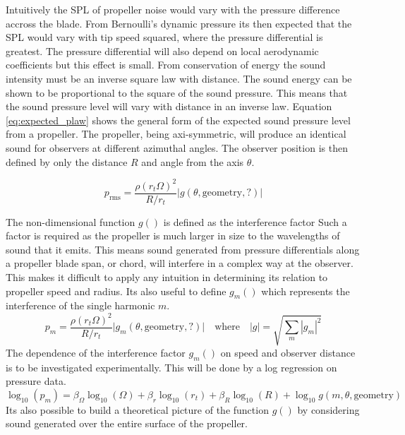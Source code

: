 \documentclass[12pt,a4paper]{article}
\begin{document}
Intuitively the SPL of propeller noise would vary with the pressure difference accross the blade.
From Bernoulli's dynamic pressure its then expected that the SPL would vary with tip speed squared, where the pressure differential is greatest.
The pressure differential will also depend on local aerodynamic coefficients but this effect is small.
From conservation of energy the sound intensity must be an inverse square law with distance.
The sound energy can be shown to be proportional to the square of the sound pressure.
This means that the sound pressure level will vary with distance in an inverse law.
Equation \ref{eq:expected_plaw} shows the general form of the expected sound pressure level from a propeller.
The propeller, being axi-symmetric, will produce an identical sound for observers at different azimuthal angles.
The observer position is then defined by only the distance $R$ and angle from the axis $\theta$.

\begin{equation}
    p_\text{rms} = \frac{\rho (r_t \Omega)^2}{R/r_t} \big| g(\theta, \text{geometry}, ?) \big| \label{eq:expected_plaw}
\end{equation}

The non-dimensional function $g()$ is defined as the interference factor %
Such a factor is required as the propeller is much larger in size to the wavelengths of sound that it emits.
This means sound generated from pressure differentials along a propeller blade span, or chord, will interfere in a complex way at the observer.
This makes it difficult to apply any intuition in determining its relation to propeller speed and radius.
Its also useful to define $g_m()$ which represents the interference of the single harmonic $m$.
\begin{equation}
    p_m = \frac{\rho (r_t \Omega)^2}{R/r_t} \big| g_m(\theta, \text{geometry}, ?) \big| \quad \text{where} \quad |g| = \sqrt{\sum_m |g_m|^2 } \label{eq:harminic_plaw}
\end{equation}
The dependence of the interference factor $g_m()$ on speed and observer distance is to be investigated experimentally.
This will be done by a log regression on pressure data.
\begin{equation}
    \log_{10}(p_m) = \beta_\Omega \log_{10}(\Omega) + \beta_r \log_{10}(r_t) +  \beta_R \log_{10}(R) + \log_{10}  g(m, \theta, \text{geometry}) 
\end{equation}
Its also possible to build a theoretical picture of the function $g()$ by considering sound generated over the entire surface of the propeller.
\end{document}
